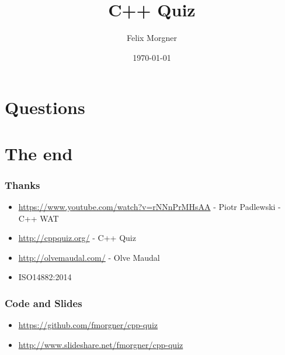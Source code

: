 \documentclass{beamer}
\title{{\Huge C++ Quiz}}
\author{Felix Morgner}
\institute{Computer Science\\Hochschule für Technik Rapperswil}
\date{\today}
\newlength{\wideitemsep}
\let\olditem\item
\renewcommand{\item}{\setlength{\itemsep}{\wideitemsep}\olditem}
\begin{document}
  \frame{\titlepage}

  
  

  \section{Questions}
  
  
  
  
  
  
  
  
  

  \section{The end}
  \frame
  {
    \frametitle{Thanks}

    \begin{itemize}
      \item \url{https://www.youtube.com/watch?v=rNNnPrMHsAA} - Piotr Padlewski - C++ WAT
      \item \url{http://cppquiz.org/} - C++ Quiz
      \item \url{http://olvemaudal.com/} - Olve Maudal
      \item ISO14882:2014
    \end{itemize}

  }
  \frame
  {
    \frametitle{Code and Slides}

    \begin{itemize}
      \item \url{https://github.com/fmorgner/cpp-quiz}
      \item \url{http://www.slideshare.net/fmorgner/cpp-quiz}
    \end{itemize}

  }

  
\end{document}
